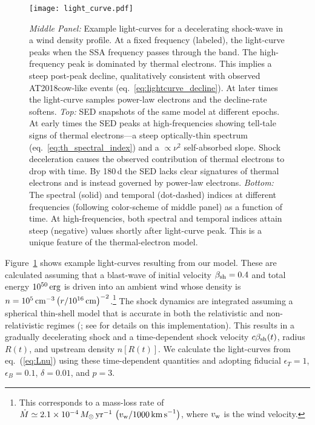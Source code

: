 \documentclass[twocolumn]{aastex63}
\begin{document}
\begin{figure}
    \texttt{[image: light\_curve.pdf]}
    \caption{{\it Middle Panel:} Example light-curves for a decelerating shock-wave in a wind density profile. At a fixed frequency (labeled), the light-curve peaks when the SSA frequency passes through the band. The high-frequency peak is dominated by thermal electrons. This implies a steep post-peak decline, qualitatively consistent with observed AT2018cow-like events (eq.~\ref{eq:lightcurve_decline}). 
    At later times the light-curve samples power-law electrons and the decline-rate softens.
    {\it Top:} SED snapshots of the same model at different epochs. At early times the SED peaks at high-frequencies showing tell-tale signs of thermal electrons---a steep optically-thin spectrum (eq.~\ref{eq:th_spectral_index}) and a $\propto \nu^2$ self-absorbed slope. Shock deceleration causes the observed contribution of thermal electrons to drop with time. By 180\,d the SED lacks clear signatures of thermal electrons and is instead governed by power-law electrons.
    {\it Bottom:} The spectral (solid) and temporal (dot-dashed) indices at different frequencies (following color-scheme of middle panel) as a function of time. At high-frequencies, both spectral and temporal indices attain steep (negative) values shortly after light-curve peak. This is a unique feature of the thermal-electron model.
    }
    \label{fig:light_curves}
\end{figure}

Figure~\ref{fig:light_curves} shows example light-curves resulting from our model. These are calculated assuming that a blast-wave of initial velocity $\beta_{\rm sh} = 0.4$ and total energy $10^{50}\,{\rm erg}$ is driven into an ambient wind whose density is $n = 10^5\,{\rm cm}^{-3} \left(r/10^{16}\,{\rm cm}\right)^{-2}$.\footnote{
This corresponds to a mass-loss rate of $\dot{M} \simeq 2.1 \times 10^{-4} \,M_\odot\, {\rm yr}^{-1}\, \left(v_{\rm w}/1000\,{\rm km\,s}^{-1}\right)$, where $v_{\rm w}$ is the wind velocity.
}
The shock dynamics are integrated assuming a spherical thin-shell model that is accurate in both the relativistic and non-relativistic regimes (\citealt{Huang+99,Peer12}; see \citealt{Schroeder+20} for details on this implementation).
This results in a gradually decelerating shock and a time-dependent shock velocity $c \beta_{\rm sh}(t)$, radius $R(t)$, and upstream density $n[R(t)]$.
We calculate the light-curves from eq.~(\ref{eq:Lnu}) using these time-dependent quantities and adopting fiducial $\epsilon_T=1$, $\epsilon_B=0.1$, $\delta = 0.01$, and $p=3$.
\end{document}
